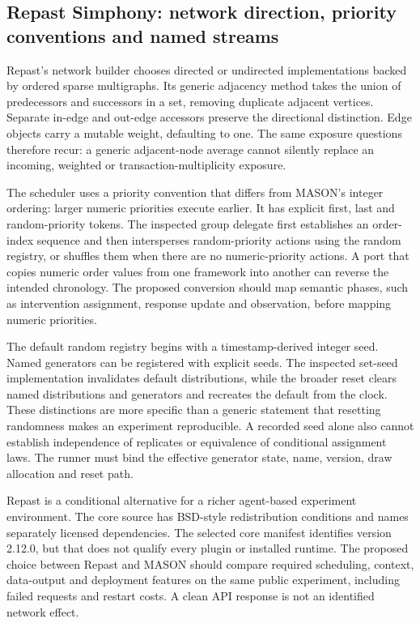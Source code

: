 \subsection{Repast Simphony: network direction, priority conventions and named streams}

Repast's network builder chooses directed or undirected implementations backed by ordered sparse multigraphs. Its generic adjacency method takes the union of predecessors and successors in a set, removing duplicate adjacent vertices. Separate in-edge and out-edge accessors preserve the directional distinction. Edge objects carry a mutable weight, defaulting to one. The same exposure questions therefore recur: a generic adjacent-node average cannot silently replace an incoming, weighted or transaction-multiplicity exposure.~\citep{exec25_jnet_repast}

The scheduler uses a priority convention that differs from MASON's integer ordering: larger numeric priorities execute earlier. It has explicit first, last and random-priority tokens. The inspected group delegate first establishes an order-index sequence and then intersperses random-priority actions using the random registry, or shuffles them when there are no numeric-priority actions. A port that copies numeric order values from one framework into another can reverse the intended chronology. The proposed conversion should map semantic phases, such as intervention assignment, response update and observation, before mapping numeric priorities.~\citep{exec25_jnet_repast}

The default random registry begins with a timestamp-derived integer seed. Named generators can be registered with explicit seeds. The inspected set-seed implementation invalidates default distributions, while the broader reset clears named distributions and generators and recreates the default from the clock. These distinctions are more specific than a generic statement that resetting randomness makes an experiment reproducible. A recorded seed alone also cannot establish independence of replicates or equivalence of conditional assignment laws. The runner must bind the effective generator state, name, version, draw allocation and reset path.~\citep{exec25_jnet_repast}

Repast is a conditional alternative for a richer agent-based experiment environment. The core source has BSD-style redistribution conditions and names separately licensed dependencies. The selected core manifest identifies version 2.12.0, but that does not qualify every plugin or installed runtime. The proposed choice between Repast and MASON should compare required scheduling, context, data-output and deployment features on the same public experiment, including failed requests and restart costs. A clean API response is not an identified network effect.~\citep{exec25_jnet_repast,exec25_jnet_choice}

